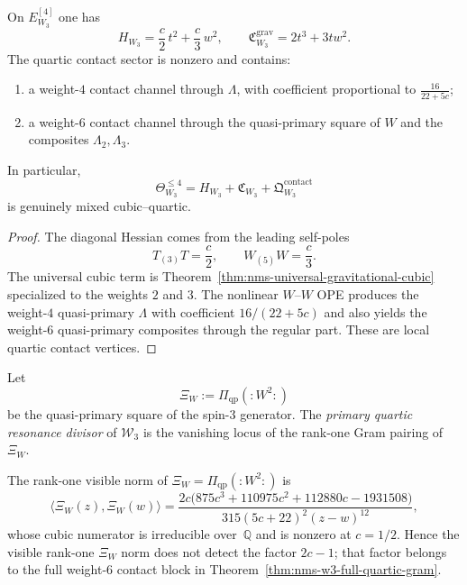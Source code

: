 \begin{theorem}
\label{thm:nms-w3-mixed-shadow-normal-form}
On $E^{[4]}_{W_3}$ one has
\[
H_{W_3}=\frac c2\,t^2+\frac c3\,w^2,
\qquad
\mathfrak C^{\mathrm{grav}}_{W_3}=2t^3+3tw^2.
\]
The quartic contact sector is nonzero and contains:
\begin{enumerate}[label=\textup{(\roman*)}]
\item a weight-$4$ contact channel through $\Lambda$, with coefficient proportional to $\frac{16}{22+5c}$;
\item a weight-$6$ contact channel through the quasi-primary square of $W$ and the composites $\Lambda_2,\Lambda_3$.
\end{enumerate}
In particular,
\[
\Theta_{W_3}^{\le 4}=H_{W_3}+\mathfrak C_{W_3}+\mathfrak Q_{W_3}^{\mathrm{contact}}
\]
is genuinely mixed cubic--quartic.
\end{theorem}

\begin{proof}
The diagonal Hessian comes from the leading self-poles
\[
T_{(3)}T=\frac c2,
\qquad
W_{(5)}W=\frac c3.
\]
The universal cubic term is Theorem~\ref{thm:nms-universal-gravitational-cubic} specialized to the weights $2$ and $3$. The nonlinear $W$--$W$ OPE produces the weight-$4$ quasi-primary $\Lambda$ with coefficient $16/(22+5c)$ and also yields the weight-$6$ quasi-primary composites through the regular part. These are local quartic contact vertices.\qedhere
\end{proof}

\begin{definition}
\label{def:nms-w3-primary-resonance}
Let
\[
\Xi_W:=\Pi_{\mathrm{qp}}(:W^2:)
\]
be the quasi-primary square of the spin-$3$ generator. The \emph{primary quartic resonance divisor} of $\mathcal W_3$ is the vanishing locus of the rank-one Gram pairing of $\Xi_W$.
\end{definition}

\begin{proposition}
\label{prop:nms-w3-visible-resonance-factor}
The rank-one visible norm of
$\Xi_W=\Pi_{\mathrm{qp}}(:W^2:)$ is
\[
\langle \Xi_W(z),\Xi_W(w)\rangle
=
\frac{2c\bigl(875c^3+110975c^2+112880c-1931508\bigr)}
 {315(5c+22)^2(z-w)^{12}},
\]
whose cubic numerator is irreducible over~$\mathbb Q$ and is nonzero
at $c=1/2$. Hence the visible rank-one $\Xi_W$ norm does not detect
the factor $2c-1$; that factor belongs to the full weight-$6$
contact block in Theorem~\ref{thm:nms-w3-full-quartic-gram}.
\end{proposition}

